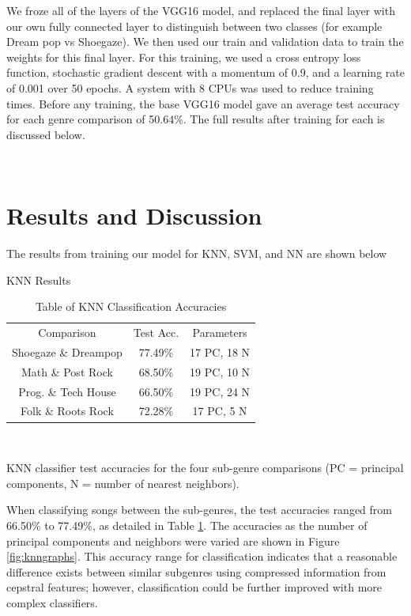 \documentclass[letterpaper, 12 pt, conference]{ieeeconf}  %
\begin{document}
We froze all of the layers of the VGG16 model, and replaced the final layer with our own fully connected layer to distinguish between two classes (for example Dream pop vs Shoegaze). We then used our train and validation data to train the weights for this final layer. For this training, we used a cross entropy loss function, stochastic gradient descent with a momentum of 0.9, and a learning rate of 0.001 over 50 epochs. A system with 8 CPUs was used to reduce training times. Before any training, the base VGG16 model gave an average test accuracy for each genre comparison of 50.64\%. The full results after training for each is discussed below.


\newline \,\,


\section{Results and Discussion}

The results from training our model for KNN, SVM, and NN are shown below
\newline \,\,

\par KNN Results

\begin{table}[!hb]
    \begin{center}
    \caption{Table of KNN Classification Accuracies}{\label{tab:knn_acc}}
    \begin{tabular}{ |c|c|c| }
      Comparison & Test Acc. & Parameters \\ 
      Shoegaze \& Dreampop & 77.49\% & 17 PC, 18 N\\
      Math \& Post Rock & 68.50\% & 19 PC, 10 N\\
      Prog. \& Tech House & 66.50\% & 19 PC, 24 N\\
      Folk \& Roots Rock & 72.28\% & 17 PC, 5 N\\
     
    \end{tabular}\\
    \end{center}
    KNN classifier test accuracies for the four sub-genre comparisons (PC = principal components, N = number of nearest neighbors). 
\end{table}

\par When classifying songs between the sub-genres, the test accuracies ranged from 66.50\% to 77.49\%, as detailed in Table \ref{tab:knn_acc}. The accuracies as the number of principal components and neighbors were varied are shown in Figure \ref{fig:knngraphs}. 
This accuracy range for classification indicates that a reasonable difference exists between similar subgenres using compressed information from cepstral features; however, classification could be further improved with more complex classifiers. 
\end{document}
